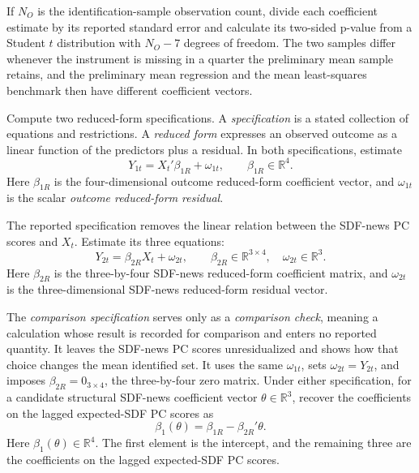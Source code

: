 \documentclass[11pt]{article}
\begin{document}
If \(N_O\) is the identification-sample observation count, divide each coefficient estimate by its
reported standard error and calculate its two-sided p-value from a Student \(t\) distribution with
\(N_O-7\) degrees of freedom. The two samples differ whenever the instrument is missing in a quarter
the preliminary mean sample retains, and the preliminary mean regression and the mean least-squares
benchmark then have different coefficient vectors.

Compute two reduced-form specifications. A \emph{specification} is a stated collection of
equations and restrictions. A \emph{reduced form} expresses an observed outcome
as a linear function of the predictors plus a residual. In both specifications, estimate
\begin{equation*}
 Y_{1t}=X_t'\beta_{1R}+\omega_{1t},
 \qquad \beta_{1R}\in\mathbb R^4.
\end{equation*}
Here \(\beta_{1R}\) is the four-dimensional outcome reduced-form coefficient vector, and \(\omega_{1t}\)
is the scalar \emph{outcome reduced-form residual}.

The reported specification removes the linear relation between the
SDF-news PC scores and \(X_t\). Estimate its three equations:
\begin{equation*}
 Y_{2t}=\beta_{2R}X_t+\omega_{2t},
 \qquad
 \beta_{2R}\in\mathbb R^{3\times4},\quad \omega_{2t}\in\mathbb R^3.
\end{equation*}
Here \(\beta_{2R}\) is the three-by-four SDF-news reduced-form coefficient matrix, and \(\omega_{2t}\) is
the three-dimensional SDF-news reduced-form residual vector.

The \emph{comparison specification} serves only as a \emph{comparison
check}, meaning a calculation whose result is recorded for comparison and enters no reported quantity. It leaves the
SDF-news PC scores unresidualized and shows how
that choice changes the mean identified set. It uses the same \(\omega_{1t}\), sets \(\omega_{2t}=Y_{2t}\), and imposes
\(\beta_{2R}=0_{3\times4}\), the three-by-four zero matrix. Under either specification, for a candidate structural SDF-news
coefficient vector \(\theta\in\mathbb R^3\), recover the coefficients on the lagged expected-SDF PC scores as
\begin{equation}
 \beta_1(\theta)=\beta_{1R}-\beta_{2R}'\theta.
 \label{eq:structural-recovery}
\end{equation}
Here \(\beta_1(\theta)\in\mathbb R^4\). The first element is the intercept, and the remaining three
are the coefficients on the lagged expected-SDF PC scores.
\end{document}
